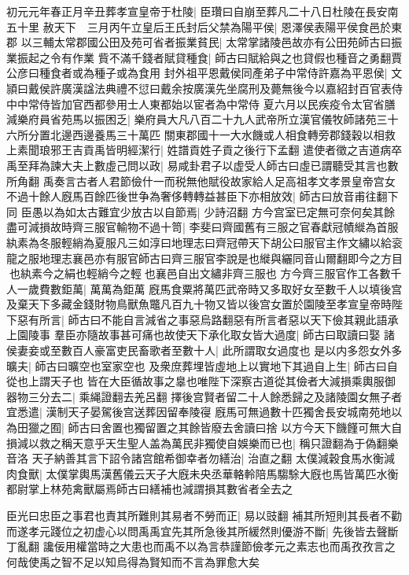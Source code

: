 初元元年春正月辛丑葬孝宣皇帝于杜陵|{
	臣瓚曰自崩至葬凡二十八日杜陵在長安南五十里}
赦天下　三月丙午立皇后王氏封后父禁為陽平侯|{
	恩澤侯表陽平侯食邑於東郡}
以三輔太常郡國公田及苑可省者振業貧民|{
	太常掌諸陵邑故亦有公田苑師古曰振業振起之令有作業}
貲不滿千錢者賦貸種食|{
	師古曰賦給與之也貸假也種音之勇翻賈公彦曰種食者或為種子或為食用}
封外祖平恩戴侯同產弟子中常侍許嘉為平恩侯|{
	文頴曰戴侯許廣漢諡法典禮不愆曰戴余按廣漢先坐腐刑及薨無後今以嘉紹封百官表侍中中常侍皆加官西都參用士人東都始以宦者為中常侍}
夏六月以民疾疫令太官省膳減樂府員省苑馬以振困乏|{
	樂府員大凡八百二十九人武帝所立漢官儀牧師諸苑三十六所分置北邊西邊養馬三十萬匹}
關東郡國十一大水饑或人相食轉旁郡錢穀以相救　上素聞琅邪王吉貢禹皆明經潔行|{
	姓譜貢姓子貢之後行下孟翻}
遣使者徵之吉道病卒禹至拜為諫大夫上數虛己問以政|{
	易咸卦君子以虚受人師古曰虛已謂聽受其言也數所角翻}
禹奏言古者人君節儉什一而税無他賦役故家給人足高祖孝文孝景皇帝宫女不過十餘人廐馬百餘匹後世争為奢侈轉轉益甚臣下亦相放效|{
	師古曰放音甫往翻下同}
臣愚以為如太古難宜少放古以自節焉|{
	少詩沼翻}
方今宫室已定無可奈何矣其餘盡可減損故時齊三服官輸物不過十笥|{
	李斐曰齊國舊有三服之官春獻冠幘縰為首服紈素為冬服輕綃為夏服凡三如淳曰地理志曰齊冠帶天下胡公曰服官主作文繡以給衮龍之服地理志襄邑亦有服官師古曰齊三服官李說是也縰與纚同音山爾翻即今之方目也紈素今之絹也輕綃今之輕也襄邑自出文繡非齊三服也}
方今齊三服官作工各數千人一歲費數鉅萬|{
	萬萬為鉅萬}
廐馬食粟將萬匹武帝時又多取好女至數千人以填後宫及棄天下多藏金錢財物鳥獸魚鼈凡百九十物又皆以後宫女置於園陵至孝宣皇帝時陛下惡有所言|{
	師古曰不能自言減省之事惡烏路翻惡有所言者惡以天下儉其親此語承上園陵事}
羣臣亦隨故事甚可痛也故使天下承化取女皆大過度|{
	師古曰取讀曰娶}
諸侯妻妾或至數百人豪富吏民畜歌者至數十人|{
	此所謂取女過度也}
是以内多怨女外多曠夫|{
	師古曰曠空也室家空也}
及衆庶葬埋皆虛地上以實地下其過自上生|{
	師古曰自從也上謂天子也}
皆在大臣循故事之辠也唯陛下深察古道從其儉者大減損乘輿服御器物三分去二|{
	乘䋲證翻去羌呂翻}
擇後宫賢者留二十人餘悉歸之及諸陵園女無子者宜悉遣|{
	漢制天子晏駕後宫送葬因留奉陵寑}
廐馬可無過數十匹獨舍長安城南苑地以為田獵之囿|{
	師古曰舍置也獨留置之其餘皆廢去舍讀曰捨}
以方今天下饑饉可無大自損減以救之稱天意乎天生聖人盖為萬民非獨使自娛樂而已也|{
	稱只證翻為于偽翻樂音洛}
天子納善其言下詔令諸宫館希御幸者勿繕治|{
	治直之翻}
太僕減穀食馬水衡減肉食獸|{
	太僕掌輿馬漢舊儀云天子大廐未央丞華輅軨陪馬騶駼大廐也馬皆萬匹水衡都尉掌上林苑禽獸屬焉師古曰繕補也減謂損其數省者全去之}


臣光曰忠臣之事君也責其所難則其易者不勞而正|{
	易以豉翻}
補其所短則其長者不勸而遂孝元踐位之初虚心以問禹禹宜先其所急後其所緩然則優游不斷|{
	先後皆去聲斷丁亂翻}
讒佞用權當時之大患也而禹不以為言恭謹節儉孝元之素志也而禹孜孜言之何哉使禹之智不足以知烏得為賢知而不言為罪愈大矣

